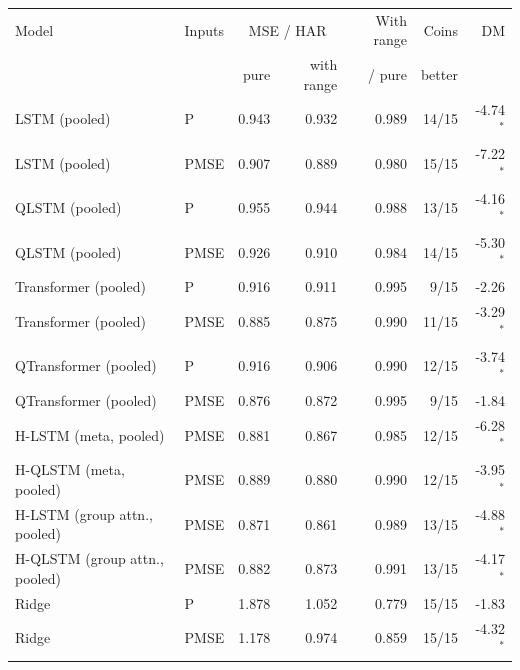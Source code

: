 \begin{tabular}{llrrrrr}
\toprule
Model & Inputs & \multicolumn{2}{c}{MSE / HAR} & With range & Coins & DM \\
 & & pure & with range & / pure & better & \\
\midrule
LSTM (pooled) & P & 0.943 & 0.932 & 0.989 & 14/15 & -4.74$^{*}$ \\
LSTM (pooled) & PMSE & 0.907 & 0.889 & 0.980 & 15/15 & -7.22$^{*}$ \\
QLSTM (pooled) & P & 0.955 & 0.944 & 0.988 & 13/15 & -4.16$^{*}$ \\
QLSTM (pooled) & PMSE & 0.926 & 0.910 & 0.984 & 14/15 & -5.30$^{*}$ \\
Transformer (pooled) & P & 0.916 & 0.911 & 0.995 & 9/15 & -2.26 \\
Transformer (pooled) & PMSE & 0.885 & 0.875 & 0.990 & 11/15 & -3.29$^{*}$ \\
QTransformer (pooled) & P & 0.916 & 0.906 & 0.990 & 12/15 & -3.74$^{*}$ \\
QTransformer (pooled) & PMSE & 0.876 & 0.872 & 0.995 & 9/15 & -1.84 \\
H-LSTM (meta, pooled) & PMSE & 0.881 & 0.867 & 0.985 & 12/15 & -6.28$^{*}$ \\
H-QLSTM (meta, pooled) & PMSE & 0.889 & 0.880 & 0.990 & 12/15 & -3.95$^{*}$ \\
H-LSTM (group attn., pooled) & PMSE & 0.871 & 0.861 & 0.989 & 13/15 & -4.88$^{*}$ \\
H-QLSTM (group attn., pooled) & PMSE & 0.882 & 0.873 & 0.991 & 13/15 & -4.17$^{*}$ \\
Ridge & P & 1.878 & 1.052 & 0.779 & 15/15 & -1.83 \\
Ridge & PMSE & 1.178 & 0.974 & 0.859 & 15/15 & -4.32$^{*}$ \\
\bottomrule
\end{tabular}
